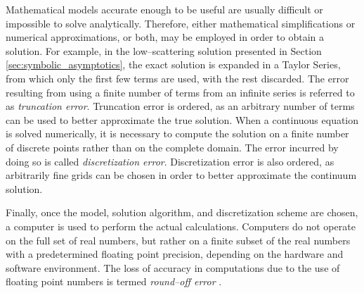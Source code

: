 Mathematical models accurate enough to be useful are usually difficult or impossible to solve analytically.
Therefore, either mathematical simplifications or numerical approximations, or both, may be employed in order to obtain a solution.
For example, in the low--scattering solution presented in Section \ref{sec:symbolic_asymptotics}, the exact solution is expanded in a Taylor Series, from which only the first few terms are used, with the rest discarded.
The error resulting from using a finite number of terms from an infinite series is referred to as \textit{truncation error}.
Truncation error is ordered, as an arbitrary number of terms can be used to better approximate the true solution.
When a continuous equation is solved numerically, it is necessary to compute the solution on a finite number of discrete points rather than on the complete domain.
The error incurred by doing so is called \textit{discretization error}.
Discretization error is also ordered, as arbitrarily fine grids can be chosen in order to better approximate the continuum solution.

Finally, once the model, solution algorithm, and discretization scheme are chosen, a computer is used to perform the actual calculations.
Computers do not operate on the full set of real numbers, but rather on a finite subset of the real numbers with a predetermined floating point precision, depending on the hardware and software environment.
The loss of accuracy in computations due to the use of floating point numbers is termed \textit{round--off error} \cite{roache_verification_1998}.


